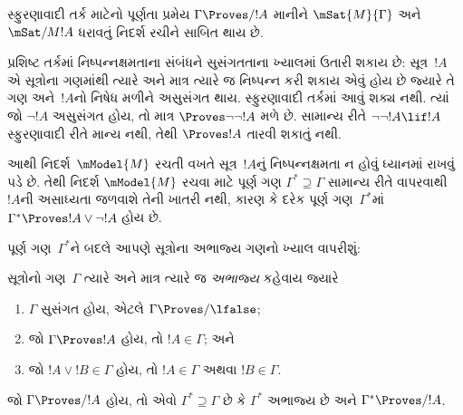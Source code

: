 \begingroup
\makeatletter{}\makeatother


\label{guunit:OLP-0506}


સ્ફુરણાવાદી તર્ક માટેનો પૂર્ણતા પ્રમેય $\Gamma \Proves/ !A$
માનીને $\mSat{M}{\Gamma}$ અને~$\mSat/{M}{!A}$ ધરાવતું
નિદર્શ રચીને સાબિત થાય છે.

પ્રશિષ્ટ તર્કમાં નિષ્પન્નક્ષમતાના સંબંધને સુસંગતતાના
ખ્યાલમાં ઉતારી શકાય છે: સૂત્ર~$!A$ એ
સૂત્રોના ગણમાંથી ત્યારે અને માત્ર ત્યારે જ
નિષ્પન્ન કરી શકાય એવું હોય છે જ્યારે તે ગણ અને~$!A$નો નિષેધ
મળીને અસુસંગત થાય. સ્ફુરણાવાદી તર્કમાં આવું શક્ય નથી.
ત્યાં જો $\lnot!A$ અસુસંગત હોય, તો માત્ર
$\Proves \lnot\lnot !A$ મળે છે. સામાન્ય રીતે
$\lnot\lnot!A \lif !A$ સ્ફુરણાવાદી રીતે માન્ય નથી,
તેથી $\Proves !A$ તારવી શકાતું નથી.

આથી નિદર્શ~$\mModel{M}$ રચતી વખતે સૂત્ર~$!A$નું
નિષ્પન્નક્ષમતા ન હોવું ધ્યાનમાં રાખવું પડે છે. તેથી નિદર્શ
$\mModel{M}$ રચવા માટે પૂર્ણ ગણ $\Gamma^* \supseteq \Gamma$
સામાન્ય રીતે વાપરવાથી $!A$ની અસાધ્યતા જળવાશે તેની
ખાતરી નથી, કારણ કે દરેક પૂર્ણ ગણ~$\Gamma^*$માં
$\Gamma^* \Proves !A \lor \lnot !A$ હોય છે.


પૂર્ણ ગણ~$\Gamma^*$ને બદલે આપણે સૂત્રોના અભાજ્ય ગણનો
ખ્યાલ વાપરીશું:

\begin{defn}
  સૂત્રોનો ગણ~$\Gamma$ ત્યારે અને માત્ર ત્યારે જ
  \emph{અભાજ્ય} કહેવાય જ્યારે
  \begin{enumerate}
  \item{} $\Gamma$ સુસંગત હોય, એટલે
    $\Gamma \Proves/ \lfalse$;
  \item{} જો $\Gamma \Proves !A$ હોય,
    તો $!A \in \Gamma$; અને
  \item{} જો $!A \lor !B \in \Gamma$
    હોય, તો $!A \in \Gamma$ અથવા $!B \in \Gamma$.
  \end{enumerate}
\end{defn}



\begin{lem}
   જો $\Gamma \Proves/ !A$ હોય,
  તો એવો $\Gamma^* \supseteq \Gamma$ છે કે $\Gamma^*$
  અભાજ્ય છે અને $\Gamma^* \Proves/ !A$.
\end{lem}

